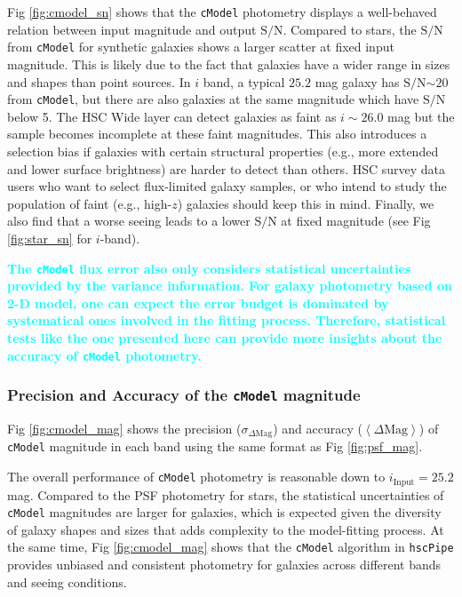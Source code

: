 \documentclass[useamsfonts]{pasj01}
\def\hscpipe{\texttt{hscPipe}}
\def\cmodel{\texttt{cModel}}
\def\s2n{{$\mathrm{S}/\mathrm{N}$}}
\newcommand{\song}[1]{\textcolor{cyan} {\textbf{#1}}}
\newcommand{\smag}{$\sigma_{\Delta\mathrm{Mag}}$}
\newcommand{\mmag}{$\left<{\Delta\mathrm{Mag}}\right>$}
\begin{document}
    Fig \ref{fig:cmodel_sn} shows that the \cmodel{} photometry displays a 
    well-behaved relation between input magnitude and output \s2n{}.  
    Compared to stars, the \s2n{} from \cmodel{} for synthetic galaxies shows a larger
    scatter at fixed input magnitude. 
    This is likely due to the fact that galaxies have a wider range in sizes and shapes 
    than point sources.  
    In $i$ band, a typical $25.2$ mag galaxy has \s2n{}${\sim}20$ from \cmodel{}, but 
    there are also galaxies at the same magnitude which have \s2n{} below 5. 
    The HSC Wide layer can detect galaxies as faint as $i{\sim}26.0$ mag but the 
    sample becomes incomplete at these faint magnitudes.
    This also introduces a selection bias if galaxies with certain structural 
    properties (e.g., more extended and lower surface brightness) are harder to detect
    than others.
    HSC survey data users who want to select flux-limited galaxy samples,
    or who intend to study the population of faint (e.g., high-$z$) galaxies should
    keep this in mind.  
    Finally, we also find that a worse seeing leads to a lower \s2n{} at fixed 
    magnitude (see Fig \ref{fig:star_sn} for $i$-band).
    
    \song{
    The \cmodel{} flux error also only considers statistical uncertainties provided by 
    the variance information. 
    For galaxy photometry based on 2-D model, one can expect the error budget is 
    dominated by systematical ones involved in the fitting process.  
    Therefore, statistical tests like the one presented here can provide more insights 
    about the accuracy of \cmodel{} photometry.  
    }

\subsubsection{Precision and Accuracy of the \cmodel{} magnitude}

    Fig \ref{fig:cmodel_mag} shows the precision (\smag{}) and accuracy (\mmag{}) of 
    \cmodel{} magnitude in each band using the same format as Fig \ref{fig:psf_mag}.

    The overall performance of \cmodel{} photometry is reasonable down to 
    $i_{\mathrm{Input}}=25.2$ mag.
    Compared to the PSF photometry for stars, the statistical uncertainties of \cmodel{} 
    magnitudes are larger for galaxies, which is expected given the diversity of galaxy 
    shapes and sizes that adds complexity to the model-fitting process.
    At the same time, Fig \ref{fig:cmodel_mag} shows that the \cmodel{} algorithm in
    \hscpipe{} provides unbiased and consistent photometry for galaxies across 
    different bands and seeing conditions.
\end{document}
